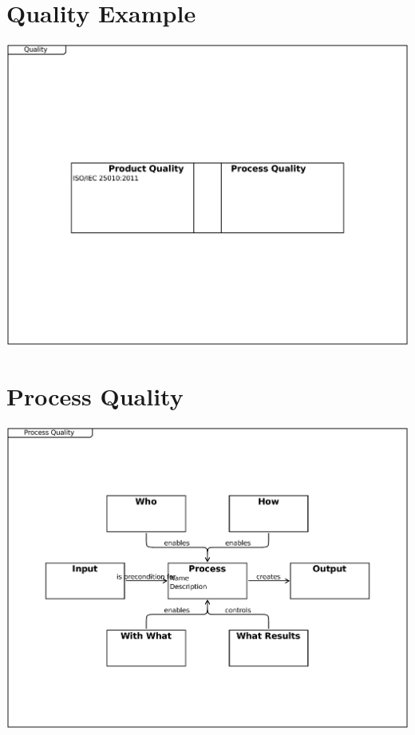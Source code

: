 \documentclass{article}
\begin{document}
\section{Quality Example}

\includegraphics[width= 1.0\linewidth]{quality_export/1_Quality.pdf}
\begin{alltt}

\end{alltt}

\section{Process Quality}

\includegraphics[width= 1.0\linewidth]{quality_export/3_Process_Quality.pdf}
\begin{alltt}

\end{alltt}
\end{document}
